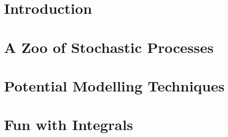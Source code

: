 \documentclass{report}
\begin{document}


\tableofcontents

\chapter{Introduction}



\chapter{A Zoo of Stochastic Processes}



\chapter{Potential Modelling Techniques}



\appendix
\chapter{Fun with Integrals}


\end{document}
